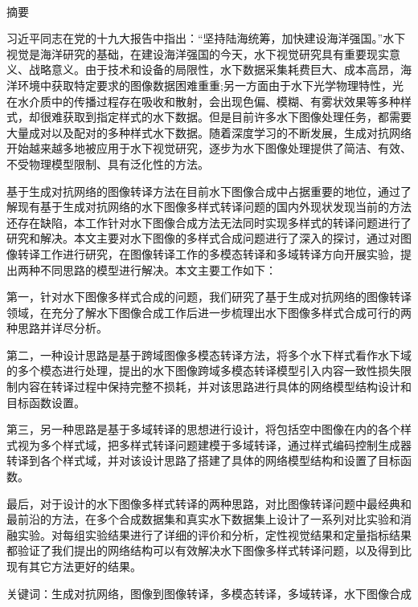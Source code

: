 \newpage

\pagestyle{plain}
\clearpage{}

\begin{center}
  {\sanhao[1.5]\heiti\oucctitle\\\vskip7pt 摘\hspace{1em}要}
\end{center}
{\normalsize\songti

习近平同志在党的十九大报告中指出：“坚持陆海统筹，加快建设海洋强国。”水下视觉是海洋研究的基础，在建设海洋强国的今天，水下视觉研究具有重要现实意义、战略意义。由于技术和设备的局限性，水下数据采集耗费巨大、成本高昂，海洋环境中获取特定要求的图像数据困难重重;另一方面由于水下光学物理特性，光在水介质中的传播过程存在吸收和散射，会出现色偏、模糊、有雾状效果等多种样式，却很难获取到指定样式的水下数据。但是目前许多水下图像处理任务，都需要大量成对以及配对的多种样式水下数据。随着深度学习的不断发展，生成对抗网络开始越来越多地被应用于水下视觉研究，逐步为水下图像处理提供了简洁、有效、不受物理模型限制、具有泛化性的方法。

基于生成对抗网络的图像转译方法在目前水下图像合成中占据重要的地位，通过了解现有基于生成对抗网络的水下图像多样式转译问题的国内外现状发现当前的方法还存在缺陷，本工作针对水下图像合成方法无法同时实现多样式的转译问题进行了研究和解决。本文主要对水下图像的多样式合成问题进行了深入的探讨，通过对图像转译工作进行研究，在图像转译工作的多模态转译和多域转译方向开展实验，提出两种不同思路的模型进行解决。本文主要工作如下：

第一，针对水下图像多样式合成的问题，我们研究了基于生成对抗网络的图像转译领域，在充分了解水下图像合成工作后进一步梳理出水下图像多样式合成可行的两种思路并详尽分析。

第二，一种设计思路是基于跨域图像多模态转译方法，将多个水下样式看作水下域的多个模态进行处理，提出的水下图像跨域多模态转译模型引入内容一致性损失限制内容在转译过程中保持完整不损耗，并对该思路进行具体的网络模型结构设计和目标函数设置。

第三，另一种思路是基于多域转译的思想进行设计，将包括空中图像在内的各个样式视为多个样式域，把多样式转译问题建模于多域转译，通过样式编码控制生成器转译到各个样式域，并对该设计思路了搭建了具体的网络模型结构和设置了目标函数。

最后，对于设计的水下图像多样式转译的两种思路，对比图像转译问题中最经典和最前沿的方法，在多个合成数据集和真实水下数据集上设计了一系列对比实验和消融实验。对每组实验结果进行了详细的评价和分析，定性视觉结果和定量指标结果都验证了我们提出的网络结构可以有效解决水下图像多样式转译问题，以及得到比现有其它方法更好的结果。
}
\vskip12bp
{\xiaosi\heiti\noindent
关键词：生成对抗网络，图像到图像转译，多模态转译，多域转译，水下图像合成}

